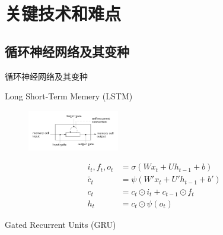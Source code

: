 \documentclass[14pt]{Bredelebeamer}
\begin{document}
\section{关键技术和难点}

\subsection{循环神经网络及其变种}
\begin{frame}{循环神经网络及其变种}

    \pause
    
    
    \begin{block}{Long Short-Term Memery (LSTM)}
    
    \begin{figure}[H]
    \begin{minipage}{0.4\linewidth}
    \centerline{\includegraphics[width=4.0cm]{images/lstm_memorycell.png}}
    \end{minipage}
    \hfill
    \begin{minipage}{.5\linewidth}
    \begin{displaymath} %
    \begin{array}{rl}
        {i_t, f_t, o_t} &= \sigma(W x_t + U h_{t-1} + b) \\
        \tilde{c_t} &= \psi(W' x_t + U' h_{t-1} + b') \\
        c_t &= c_t \odot i_t + c_{t-1} \odot f_t \\
        h_t &= c_t \odot \psi(o_t)
    \end{array}
    \end{displaymath}
    \end{minipage}
    \label{lstm}
    \end{figure}


    \end{block}
    \pause
    \begin{block}{Gated Recurrent Units (GRU)}
    

\end{block}
\end{frame}
\end{document}
